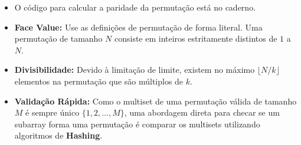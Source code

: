 \begin{itemize}
    \item O código para calcular a paridade da permutação está no caderno.
    \item \textbf{Face Value:} Use as definições de permutação de forma literal. Uma permutação de tamanho $N$ consiste em inteiros estritamente distintos de $1$ a $N$.
    \item \textbf{Divisibilidade:} Devido à limitação de limite, existem no máximo $\lfloor N/k \rfloor$ elementos na permutação que são múltiplos de $k$.
    \item \textbf{Validação Rápida:} Como o multiset de uma permutação válida de tamanho $M$ é sempre único $\{1, 2, \dots, M\}$, uma abordagem direta para checar se um subarray forma uma permutação é comparar os multisets utilizando algoritmos de \textbf{Hashing}.
\end{itemize}